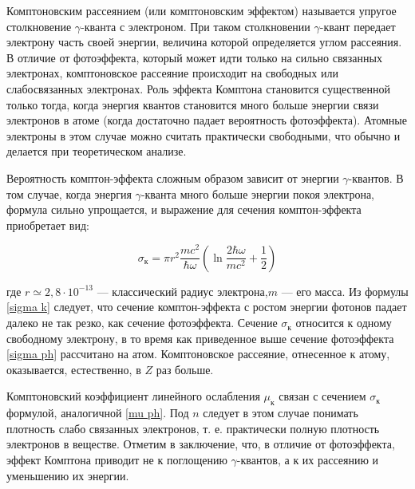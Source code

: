 Комптоновским рассеянием (или комптоновским эффектом) называется упругое
столкновение $\gamma$-кванта с электроном. При таком столкновении $\gamma$-квант
передает электрону часть своей энергии, величина которой определяется углом
рассеяния. В отличие от фотоэффекта, который может идти только на сильно
связанных электронах, комптоновское рассеяние происходит на свободных или
слабосвязанных электронах. Роль эффекта Комптона становится существенной только
тогда, когда энергия квантов становится много больше энергии связи электронов в
атоме (когда достаточно падает вероятность фотоэффекта). Атомные электроны в
этом случае можно считать практически свободными, что обычно и делается при
теоретическом анализе.

Вероятность комптон-эффекта сложным образом зависит от энергии $\gamma$-квантов.
В том случае, когда энергия $\gamma$-кванта много больше энергии покоя
электрона, формула сильно упрощается, и выражение для сечения комптон-эффекта
приобретает  вид:

\begin{equation}\label{sigma k}
\sigma_{\text{к}} = \pi r^2 \dfrac{mc^2}{\hbar\omega} \left( \ln{\dfrac{2\hbar\omega}{mc^2} + \dfrac{1}{2}} \right) 
\end{equation}

где $ r \simeq 2,8 \cdot 10^{-13} $ --- классический радиус электрона,$ m $ ---
его масса. Из формулы \eqref{sigma k} следует, что сечение комптон-эффекта с
ростом энергии фотонов падает далеко не так резко, как сечение фотоэффекта.
Сечение $\sigma_{\text{к}}$ относится к одному свободному электрону, в то время
как приведенное выше сечение фотоэффекта \eqref{sigma ph} рассчитано на атом.
Комптоновское рассеяние, отнесенное к атому, оказывается, естественно, в $Z$ раз
больше. 

Комптоновский коэффициент линейного ослабления $\mu_{\text{к}}$ связан с
сечением $\sigma_{\text{к}}$ формулой, аналогичной \eqref{mu ph}. Под $n$
следует в этом случае понимать плотность слабо связанных электронов, т. е.
практически полную плотность электронов в веществе. Отметим в заключение, что, в
отличие от фотоэффекта, эффект Комптона приводит не к поглощению
$\gamma$-квантов, а к их рассеянию и уменьшению их энергии.
